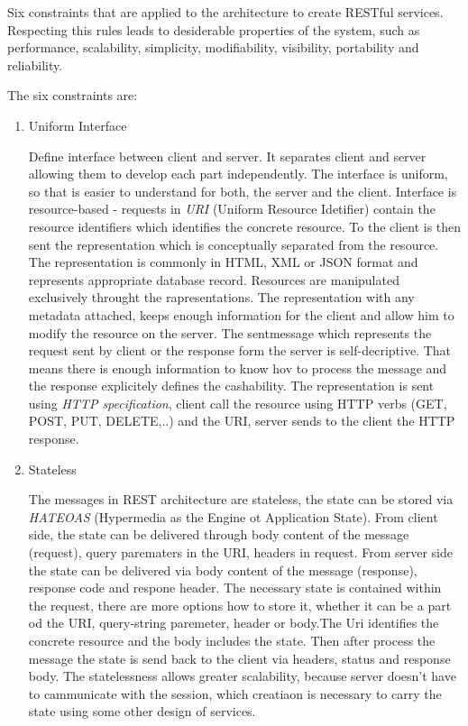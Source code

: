 Six constraints that are applied to the architecture to create RESTful services. Respecting this rules leads to desiderable properties of the system, such as performance, scalability, simplicity, modifiability, visibility, portability and reliability. 
\begin{description}
  \item The six constraints are:

\begin{enumerate}
  \item Uniform Interface
  
Define interface between client and server. It separates client and server allowing them to develop each part independently. The interface is uniform, so that is
easier to understand for both, the server and the client.
Interface is resource-based - requests in \emph {URI} (Uniform Resource Idetifier) contain the resource identifiers which identifies the concrete resource. To the client is then sent the representation which is conceptually separated from the resource. The representation is commonly in HTML, XML or JSON format and represents appropriate database record.
Resources are manipulated exclusively throught the rapresentations. The representation with any metadata attached, keeps enough information for the client and allow him to modify the resource on the server.
The sentmessage which represents the request sent by client or the response form the server is self-decriptive. That means there is enough information to know hov to process the message and the response explicitely defines the cashability.
The representation is sent using \emph{HTTP specification}, client call the resource using HTTP verbs (GET, POST, PUT, DELETE,..) and the URI, server sends to the client the HTTP response.


  \item Stateless

The messages in REST architecture are stateless, the state can be stored via \emph {HATEOAS} (Hypermedia as the Engine ot Application State). From client side, the state can be delivered through body content of the message (request), query parematers in the URI, headers in request. From server side the state can be delivered via body content of the message (response), response code and respone header. 
The necessary state is contained within the request, there are more options how to store it, whether it can be a part od the URI, query-string paremeter, header or body.The Uri identifies the concrete resource and the body includes the state. Then after process the message the state is send back to the client via headers, status and response body.
The statelessness allows greater scalability, because server doesn't have to cammunicate with the session, which creatiaon is necessary to carry the state using some other design of services.



\end{enumerate}
\end{description}
